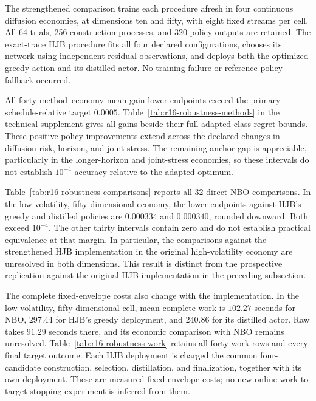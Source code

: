 The strengthened comparison trains each procedure afresh in four continuous
diffusion economies, at dimensions ten and fifty, with eight fixed streams
per cell. All 64 trials, 256 construction processes, and 320 policy outputs
are retained. The exact-trace HJB procedure fits all four declared
configurations, chooses its network using independent residual observations,
and deploys both the optimized greedy action and its distilled actor.
No training failure or reference-policy fallback occurred.

All forty method--economy mean-gain lower endpoints exceed the primary
schedule-relative target $0.0005$. Table~\ref{tab:r16-robustness-methods} in
the technical supplement gives all gains beside their full-adapted-class
regret bounds. These positive policy improvements extend across the declared
changes in diffusion risk, horizon, and joint stress. The remaining anchor
gap is appreciable, particularly in the longer-horizon and joint-stress
economies, so these intervals do not establish $10^{-4}$ accuracy relative
to the adapted optimum.

Table~\ref{tab:r16-robustness-comparisons} reports all 32 direct NBO
comparisons. In the low-volatility, fifty-dimensional economy, the lower
endpoints against HJB's greedy and distilled policies are $0.000334$ and
$0.000340$, rounded downward. Both exceed $10^{-4}$. The other thirty
intervals contain zero and do not establish practical equivalence at that
margin. In particular, the comparisons against the strengthened HJB
implementation in the original high-volatility economy are unresolved in
both dimensions. This result is distinct from the prospective replication
against the original HJB implementation in the preceding subsection.



The complete fixed-envelope costs also change with the implementation.
In the low-volatility, fifty-dimensional cell, mean complete work is
$102.27$ seconds for NBO, $297.44$ for HJB's greedy deployment, and $240.86$
for its distilled actor. Raw takes $91.29$ seconds there, and its economic
comparison with NBO remains unresolved. Table~\ref{tab:r16-robustness-work}
retains all forty work rows and every final target outcome. Each HJB
deployment is charged the common four-candidate construction, selection,
distillation, and finalization, together with its own deployment. These
are measured fixed-envelope costs; no new online work-to-target stopping
experiment is inferred from them.

